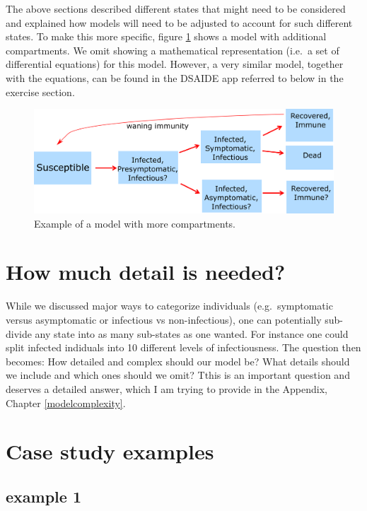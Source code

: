 \documentclass[]{book}
\theoremstyle{definition}
\theoremstyle{definition}
\theoremstyle{definition}
\theoremstyle{remark}
\begin{document}
The above sections described different states that might need to be
considered and explained how models will need to be adjusted to account
for such different states. To make this more specific, figure
\ref{fig:complicatedmodel} shows a model with additional compartments.
We omit showing a mathematical representation (i.e.~a set of
differential equations) for this model. However, a very similar model,
together with the equations, can be found in the DSAIDE app referred to
below in the exercise section.

\begin{figure}
\centering
\includegraphics{./images/ComplicatedModel.png}
\caption{\label{fig:complicatedmodel}Example of a model with more
compartments.}
\end{figure}

\hypertarget{how-much-detail-is-needed}{%
\section{How much detail is needed?}\label{how-much-detail-is-needed}}

While we discussed major ways to categorize individuals
(e.g.~symptomatic versus asymptomatic or infectious vs non-infectious),
one can potentially sub-divide any state into as many sub-states as one
wanted. For instance one could split infected indiduals into 10
different levels of infectiousness. The question then becomes: How
detailed and complex should our model be? What details should we include
and which ones should we omit? Tthis is an important question and
deserves a detailed answer, which I am trying to provide in the
Appendix, Chapter \ref{modelcomplexity}.

\hypertarget{case-study-examples}{%
\section{Case study examples}\label{case-study-examples}}

\hypertarget{example-1}{%
\subsection{example 1}\label{example-1}}
\end{document}
